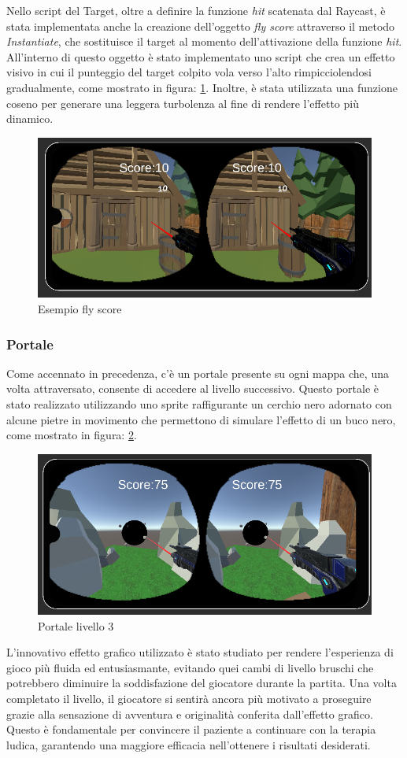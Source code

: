 \documentclass[
a4paper,
cleardoublepage=empty,
headings=twolinechapter,
numbers=autoenddot,
]{scrbook}
\begin{document}
	Nello script del Target, oltre a definire la funzione \textit{hit} scatenata dal Raycast, è stata implementata anche la creazione dell'oggetto \textit{fly score} attraverso il metodo \textit{Instantiate}, che sostituisce il target al momento dell'attivazione della funzione \textit{hit}. All'interno di questo oggetto è stato implementato uno script che crea un effetto visivo in cui il punteggio del target colpito vola verso l'alto rimpicciolendosi gradualmente, come mostrato in figura: \ref{fig:fly score}. Inoltre, è stata utilizzata una funzione coseno per generare una leggera turbolenza al fine di rendere l'effetto più dinamico.
	\begin{figure}[H]
		\centering
		\includegraphics[width=0.6\linewidth]{image/fly score}
		\caption{Esempio fly score}
		\label{fig:fly score}
	\end{figure}
	\subsubsection{Portale}
   Come accennato in precedenza, c'è un portale presente su ogni mappa che, una volta attraversato, consente di accedere al livello successivo. Questo portale è stato realizzato utilizzando uno sprite raffigurante un cerchio nero adornato con alcune pietre in movimento che permettono di simulare l'effetto di un buco nero, come mostrato in figura: \ref{fig:portale}. 
  \begin{figure}[H]
  	\centering
  	\includegraphics[width=0.6\linewidth]{image/portale}
  	\caption{Portale livello 3}
  	\label{fig:portale}
  \end{figure}
   L'innovativo effetto grafico utilizzato è stato studiato per rendere l'esperienza di gioco più fluida ed entusiasmante, evitando quei cambi di livello bruschi che potrebbero diminuire la soddisfazione del giocatore durante la partita. Una volta completato il livello, il giocatore si sentirà ancora più motivato a proseguire grazie alla sensazione di avventura e originalità conferita dall'effetto grafico. Questo è fondamentale per convincere il paziente a continuare con la terapia ludica, garantendo una maggiore efficacia nell'ottenere i risultati desiderati.
\end{document}
